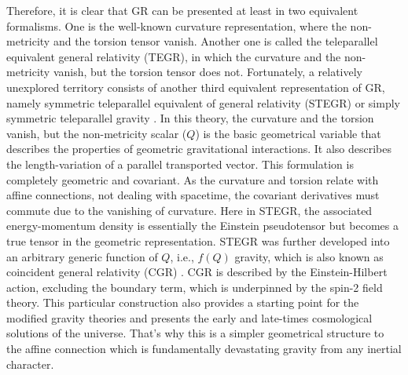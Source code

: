 \documentclass[aps,prd,showpacs,nofootinbib,floats,floatfix,preprintnumbers,groupedaddress,twocolumn]{revtex4-1}
\begin{document}
    Therefore, it is clear that GR can be presented at least in two equivalent formalisms. One is the well-known curvature representation, where the non-metricity and the torsion tensor vanish. Another one is called the teleparallel equivalent general relativity (TEGR), in which the curvature and the non-metricity vanish, but the torsion tensor does not. Fortunately, a relatively unexplored territory consists of another third equivalent representation of GR, namely symmetric teleparallel equivalent of general relativity (STEGR) or simply symmetric teleparallel gravity \cite{Nester}. In this theory, the curvature and the torsion vanish, but the non-metricity scalar ($Q$) is the basic geometrical variable that describes the properties of geometric gravitational interactions. It also describes the length-variation of a parallel transported vector. This formulation is completely geometric and covariant. As the curvature and torsion relate with affine connections, not dealing with spacetime, the covariant derivatives must commute due to the vanishing of curvature. Here in STEGR, the associated energy-momentum density is essentially the Einstein pseudotensor but becomes a true tensor in the geometric representation. STEGR was further developed into an arbitrary generic function of $Q$, i.e., $f(Q)$ gravity, which is also known as coincident general relativity (CGR) \cite{Lavinia}. CGR is described by the Einstein-Hilbert action, excluding the boundary term, which is underpinned by the spin-2 field theory. This particular construction also provides a starting
    point for the modified gravity theories and presents the early and late-times cosmological solutions of the universe. That's why this is a simpler geometrical structure to the affine connection which is fundamentally devastating gravity from any inertial character.
\end{document}
